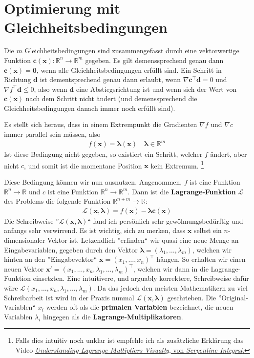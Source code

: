 \documentclass{report}
\newcommand{\tbf}{\textbf}
\newcommand*{\newpar}{\par\vspace{\baselineskip}\noindent}
\begin{document}
\section{Optimierung mit Gleichheitsbedingungen}
Die $m$ Gleichheitsbedingungen sind zusammengefasst durch eine vektorwertige Funktion $\bm{c(x)}: \mathbb{R}^n \to \mathbb{R}^m$ gegeben. Es gilt demenssprechend genau dann $\bm{c(x)} = \bm{0}$, wenn alle Gleichheitsbedingungen erfüllt sind. Ein Schritt in Richtung $\bm{d}$ ist dementsprechend genau dann erlaubt, wenn $\nabla \bm{c}^\top \bm{d} = 0$ und $\nabla f^\top \bm{d} \leq 0$, also wenn $\bm{d}$ eine Abstiegsrichtung ist und wenn sich der Wert von $\bm{c(x)}$ nach dem Schritt nicht ändert (und demenssprechend die Gleichheitsbedingungen danach immer noch erfüllt sind).
\newpar
Es stellt sich heraus, dass in einem Extrempunkt die Gradienten $\nabla f$ und $\nabla c$ immer parallel sein müssen, also
\begin{align*}
 f(\bm{x})  = \bm{\lambda} (\bm{x}) \quad \bm{\lambda} \in \mathbb{R}^m
\end{align*}
Ist diese Bedingung nicht gegeben, so existiert ein Schritt, welcher $f$ ändert, aber nicht $c$, und somit ist die momentane Position $\bm{x}$ kein Extremum. \footnote{Falls dies intuitiv noch unklar ist empfehle ich als zusätzliche Erklärung das Video \href{https://www.youtube.com/watch?v=5A39Ht9Wcu0}{\textit{Understanding Lagrange Multipliers Visually}, von \textit{Serpentine Integral}.}}
\newpar
Diese Bedingung können wir nun ausnutzen. Angenommen, $f$ ist eine Funktion $\mathbb{R}^n \to \mathbb{R}$ und $c$ ist eine Funktion $\mathbb{R}^n \to \mathbb{R}^m$. Dann ist die \tbf{Lagrange-Funktion} $\mathcal{L}$ des Problems die folgende Funktion $\mathbb{R}^{n+m} \to \mathbb{R}$:
\begin{align*}
 \mathcal{L}(\bm{x}, \bm{\lambda}) = f(\bm{x}) - \bm{\lambda} \bm{c}(\bm{x})
\end{align*}
Die Schreibweise ''$\mathcal{L}(\bm{x}, \bm{\lambda})$`` fand ich persönlich sehr gewöhnungsbedürftig und anfangs sehr verwirrend. Es ist wichtig, sich zu merken, dass $\bm{x}$ selbst ein $n$-dimensionaler Vektor ist. Letzendlich ''erfinden`` wir quasi eine neue Menge an Eingabevariablen, gegeben durch den Vektor $\bm{\lambda} = (\lambda_1, \hdots, \lambda_m)$, welchen wir hinten an den ''Eingabevektor`` $\bm{x} = (x_1, \hdots, x_n)^\top$ hängen. So erhalten wir einen neuen Vektor $\bm{x}' = (x_1, \hdots, x_n, \lambda_1, \hdots, \lambda_m)^\top$, welchen wir dann in die Lagrange-Funktion einsetzten. Eine intuitivere, und arguably korrektere, Schreibweise dafür wäre $\mathcal{L}(x_1, \hdots, x_n, \lambda_1, \hdots, \lambda_m)$. Da das jedoch den meisten Mathematikern zu viel Schreibarbeit ist wird in der Praxis nunmal $\mathcal{L}(\bm{x}, \bm{\lambda})$ geschrieben. Die ''Original-Variablen`` $x_i$ werden oft als die \tbf{primalen Variablen} bezeichnet, die neuen Variablen $\lambda_i$ hingegen als die \tbf{Lagrange-Multiplikatoren}.
\end{document}
